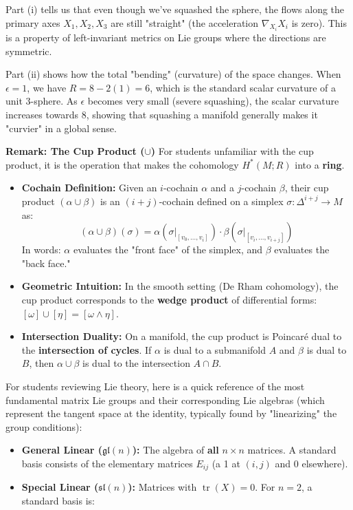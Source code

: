 \begin{solution}
Part (i) tells us that even though we've squashed the sphere, the flows along the primary axes $X_1, X_2, X_3$ are still "straight" (the acceleration $\nabla_{X_i}X_i$ is zero). This is a property of left-invariant metrics on Lie groups where the directions are symmetric.

Part (ii) shows how the total "bending" (curvature) of the space changes. When $\epsilon = 1$, we have $R = 8 - 2(1) = 6$, which is the standard scalar curvature of a unit 3-sphere. As $\epsilon$ becomes very small (severe squashing), the scalar curvature increases towards 8, showing that squashing a manifold generally makes it "curvier" in a global sense.

\textbf{Remark: The Cup Product ($\cup$)}
For students unfamiliar with the cup product, it is the operation that makes the cohomology $H^*(M; R)$ into a \textbf{ring}. 
\begin{itemize}
    \item \textbf{Cochain Definition:} Given an $i$-cochain $\alpha$ and a $j$-cochain $\beta$, their cup product $(\alpha \cup \beta)$ is an $(i+j)$-cochain defined on a simplex $\sigma: \Delta^{i+j} \to M$ as:
    \[ (\alpha \cup \beta)(\sigma) = \alpha(\sigma|_{[v_0, \dots, v_i]}) \cdot \beta(\sigma|_{[v_i, \dots, v_{i+j}]}) \]
    In words: $\alpha$ evaluates the "front face" of the simplex, and $\beta$ evaluates the "back face."
    \item \textbf{Geometric Intuition:} In the smooth setting (De Rham cohomology), the cup product corresponds to the \textbf{wedge product} of differential forms: $[\omega] \cup [\eta] = [\omega \wedge \eta]$. 
    \item \textbf{Intersection Duality:} On a manifold, the cup product is Poincaré dual to the \textbf{intersection of cycles}. If $\alpha$ is dual to a submanifold $A$ and $\beta$ is dual to $B$, then $\alpha \cup \beta$ is dual to the intersection $A \cap B$.
\end{itemize}
For students reviewing Lie theory, here is a quick reference of the most fundamental matrix Lie groups and their corresponding Lie algebras (which represent the tangent space at the identity, typically found by "linearizing" the group conditions):
\begin{itemize}
    \item \textbf{General Linear ($\mathfrak{gl}(n)$):} The algebra of \textbf{all} $n \times n$ matrices. A standard basis consists of the elementary matrices $E_{ij}$ (a 1 at $(i, j)$ and 0 elsewhere).
    \item \textbf{Special Linear ($\mathfrak{sl}(n)$):} Matrices with $\operatorname{tr}(X) = 0$. For $n=2$, a standard basis is:

\end{itemize}
\end{solution}

